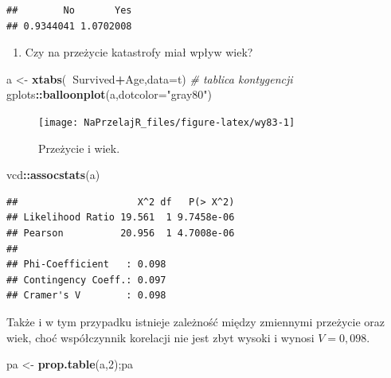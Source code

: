 \documentclass[polish,]{book}
\newenvironment{Shaded}{\begin{snugshade}}{\end{snugshade}}
\newcommand{\CommentTok}[1]{\textcolor[rgb]{0.56,0.35,0.01}{\textit{#1}}}
\newcommand{\DataTypeTok}[1]{\textcolor[rgb]{0.13,0.29,0.53}{#1}}
\newcommand{\DecValTok}[1]{\textcolor[rgb]{0.00,0.00,0.81}{#1}}
\newcommand{\KeywordTok}[1]{\textcolor[rgb]{0.13,0.29,0.53}{\textbf{#1}}}
\newcommand{\NormalTok}[1]{#1}
\newcommand{\OperatorTok}[1]{\textcolor[rgb]{0.81,0.36,0.00}{\textbf{#1}}}
\newcommand{\StringTok}[1]{\textcolor[rgb]{0.31,0.60,0.02}{#1}}
\providecommand{\tightlist}{%
  \setlength{\itemsep}{0pt}\setlength{\parskip}{0pt}}
\begin{document}
\begin{verbatim}
##        No       Yes 
## 0.9344041 1.0702008
\end{verbatim}

\begin{enumerate}
\def\labelenumi{\arabic{enumi}.}
\setcounter{enumi}{2}
\tightlist
\item
  Czy na przeżycie katastrofy miał wpływ wiek?
\end{enumerate}

\begin{Shaded}
\begin{Highlighting}[]
\NormalTok{a <-}\StringTok{ }\KeywordTok{xtabs}\NormalTok{(}\OperatorTok{~}\NormalTok{Survived}\OperatorTok{+}\NormalTok{Age,}\DataTypeTok{data=}\NormalTok{t) }\CommentTok{# tablica kontygencji}
\NormalTok{gplots}\OperatorTok{::}\KeywordTok{balloonplot}\NormalTok{(a,}\DataTypeTok{dotcolor=}\StringTok{"gray80"}\NormalTok{)}
\end{Highlighting}
\end{Shaded}

\begin{figure}[h]

{\centering \texttt{[image: NaPrzelajR\_files/figure-latex/wy83-1]} 

}

\caption{Przeżycie i wiek.}\label{fig:wy83}
\end{figure}

\begin{Shaded}
\begin{Highlighting}[]
\NormalTok{vcd}\OperatorTok{::}\KeywordTok{assocstats}\NormalTok{(a)}
\end{Highlighting}
\end{Shaded}

\begin{verbatim}
##                     X^2 df   P(> X^2)
## Likelihood Ratio 19.561  1 9.7458e-06
## Pearson          20.956  1 4.7008e-06
## 
## Phi-Coefficient   : 0.098 
## Contingency Coeff.: 0.097 
## Cramer's V        : 0.098
\end{verbatim}

Także i w tym przypadku istnieje zależność między zmiennymi przeżycie oraz wiek,
choć współczynnik korelacji nie jest zbyt wysoki i wynosi \(V = 0,098\).

\begin{Shaded}
\begin{Highlighting}[]
\NormalTok{pa <-}\StringTok{ }\KeywordTok{prop.table}\NormalTok{(a,}\DecValTok{2}\NormalTok{);pa}
\end{Highlighting}
\end{Shaded}
\end{document}
